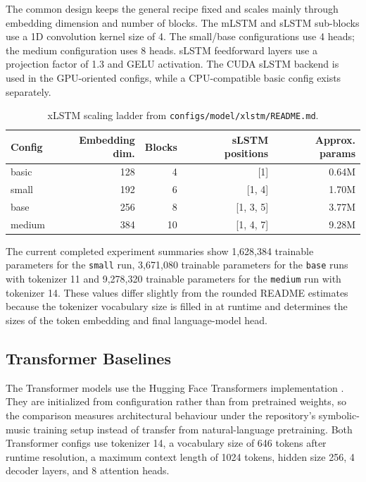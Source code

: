 The common design keeps the general recipe fixed and scales mainly through embedding dimension and number of blocks. The mLSTM and sLSTM sub-blocks use a 1D convolution kernel size of 4. The small/base configurations use 4 heads; the medium configuration uses 8 heads. sLSTM feedforward layers use a projection factor of 1.3 and GELU activation. The CUDA sLSTM backend is used in the GPU-oriented configs, while a CPU-compatible basic config exists separately.

\begin{table}[htbp]
	\centering
	\begin{tabular}{lrrrr}
		\toprule
		Config & Embedding dim. & Blocks & sLSTM positions & Approx. params \\
		\midrule
		basic  & 128            & 4      & [1]             & 0.64M          \\
		small  & 192            & 6      & [1, 4]          & 1.70M          \\
		base   & 256            & 8      & [1, 3, 5]       & 3.77M          \\
		medium & 384            & 10     & [1, 4, 7]       & 9.28M          \\
		\bottomrule
	\end{tabular}
	\caption{xLSTM scaling ladder from \texttt{configs/model/xlstm/README.md}.}
	\label{tab:xlstm_scale}

\end{table}

The current completed experiment summaries show 1,628,384 trainable parameters for the \verb|small| run, 3,671,080 trainable parameters for the \verb|base| runs with tokenizer 11 and 9,278,320 trainable parameters for the \verb|medium| run with tokenizer 14.  These values differ slightly from the rounded README estimates because the tokenizer vocabulary size is filled in at runtime and determines the sizes of the token embedding and final language-model head.

\subsection{Transformer Baselines}

The Transformer models use the Hugging Face Transformers implementation
\citep{wolfTransformersStateoftheArtNatural2020}.
They are initialized from
configuration rather than from pretrained weights, so the comparison measures
architectural behaviour under the repository's symbolic-music training setup
instead of transfer from natural-language pretraining. Both Transformer configs
use tokenizer 14, a vocabulary size of 646 tokens after runtime resolution, a
maximum context length of 1024 tokens, hidden size 256, 4 decoder layers, and 8
attention heads.

